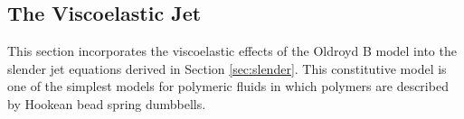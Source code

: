\documentclass[11pt]{article}
\begin{document}
\subsection{The Viscoelastic Jet}
This section incorporates the viscoelastic effects of the Oldroyd B model \citep{oldroyd1950formulation} into the slender jet equations derived in Section \ref{sec:slender}. This constitutive model is one of the simplest models for polymeric fluids in which polymers are described by Hookean bead spring dumbbells.

%
\end{document}
